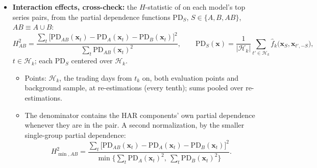 \begin{itemize}
\begin{itemize}
    XGBoost \rhfiXgbInterTopA{} $\times$ \rhfiXgbInterTopB{} (\rhfiXgbInterTopVal); random forest
    \rhfiRfInterTopA{} $\times$ \rhfiRfInterTopB{} (\rhfiRfInterTopVal); $\times 10^{-3}$, in units of $y_t$.
  \item Scale: largest $\bar I_A$ \rhfiLgbmMainTopVal, \rhfiXgbMainTopVal, \rhfiRfMainTopVal{} ($\times 10^{-3}$); all
    series-pair $\bar I_{AB}$ summed, as \% of $\sum_A \bar I_A$: \rhfiLgbmInterRatio, \rhfiXgbInterRatio,
    \rhfiRfInterRatio.
  \item Within a group ($\sum_{j \ne l \in A} \phi_{t,jl}$): largest \rhfiLgbmWithinTop{} (\rhfiLgbmWithinTopVal),
    \rhfiXgbWithinTop{} (\rhfiXgbWithinTopVal), \rhfiRfWithinTop{} (\rhfiRfWithinTopVal); $\times 10^{-3}$.
  \item Noise floor: the continuous probe's largest $\bar I$ with any group, median over probe fits:
    \rhfiLgbmInterFloor, \rhfiXgbInterFloor, \rhfiRfInterFloor{} ($\times 10^{-3}$); series pairs above it:
    \rhfiLgbmInterAboveFloor, \rhfiXgbInterAboveFloor, \rhfiRfInterAboveFloor{} of \rhfiNPairs.
  \end{itemize}
\item \textbf{Interaction effects, cross-check:} the $H$-statistic of \citet{FriedmanPopescu2008} on each model's top
  \rhfiHTopSeries{} series pairs, from the partial dependence functions $\mathrm{PD}_S$, $S \in \{A, B, AB\}$,
  $AB \equiv A \cup B$:
  \[
    H^2_{AB} = \frac{\sum_{t} \bigl[\mathrm{PD}_{AB}(\bm x_t) - \mathrm{PD}_A(\bm x_t) - \mathrm{PD}_B(\bm x_t)\bigr]^2}
                    {\sum_{t} \mathrm{PD}_{AB}(\bm x_t)^2}, \qquad
    \mathrm{PD}_S(\bm x) = \frac{1}{|\mathcal H_k|} \sum_{t' \in \mathcal H_k} \hat f_k\bigl(\bm x_S, \bm x_{t',-S}\bigr),
  \]
  $t \in \mathcal H_k$; each $\mathrm{PD}_S$ centered over $\mathcal H_k$.
  \begin{itemize}
  \item Points: $\mathcal H_k$, the \rhfiHRows{} trading days from $t_k$ on, both evaluation points and background
    sample, at \rhfiHRefits{} re-estimations (every tenth); sums pooled over re-estimations.
  \item The denominator contains the HAR components' own partial dependence whenever they are in the pair. A second
    normalization, by the smaller single-group partial dependence:
    \[
      H^2_{\min,AB} = \frac{\sum_{t} \bigl[\mathrm{PD}_{AB}(\bm x_t) - \mathrm{PD}_A(\bm x_t) - \mathrm{PD}_B(\bm x_t)\bigr]^2}
                           {\min\bigl\{\sum_{t} \mathrm{PD}_A(\bm x_t)^2,\ \sum_{t} \mathrm{PD}_B(\bm x_t)^2\bigr\}} .
\]
\end{itemize}
\end{itemize}
